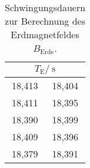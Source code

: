 \begin{table}[H]
	\centering
	\begin{tabular}{cc}
	\toprule
	\multicolumn{2}{c}{$T_\text{E}/\:\si{\second}$}\\
	\midrule
		18,413 & 18,404\\
		18,411 & 18,395\\
		18,390 & 18,399\\
		18,409 & 18,396\\
		18,379 & 18,391\\
	\bottomrule
	\end{tabular}
	\caption{Schwingungsdauern zur Berechnung des Erdmagnetfeldes $B_\text{Erde}$.}
	\label{tab:T_E}
\end{table}
